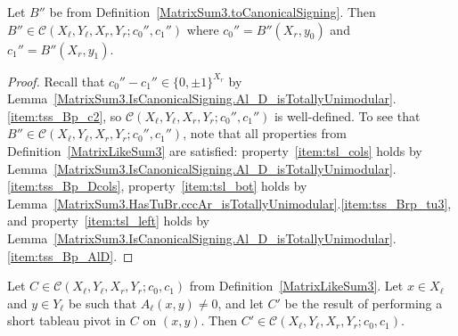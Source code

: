 \begin{lemma}
    \label{lem:three_sum_like_signing_B}
    \leanok
    Let $B''$ be from Definition~\ref{MatrixSum3.toCanonicalSigning}. Then $B'' \in \mathcal{C} (X_{\ell}, Y_{\ell}, X_{r}, Y_{r}; c_{0}'', c_{1}'')$ where $c_{0}'' = B'' (X_{r}, y_{0})$ and $c_{1}'' = B'' (X_{r}, y_{1})$.
\end{lemma}

\begin{proof}
    Recall that $c_{0}'' - c_{1}'' \in \{0, \pm 1\}^{X_{r}}$ by Lemma~\ref{MatrixSum3.IsCanonicalSigning.Al_D_isTotallyUnimodular}.\ref{item:tss_Bp_c2}, so $\mathcal{C} (X_{\ell}, Y_{\ell}, X_{r}, Y_{r}; c_{0}'', c_{1}'')$ is well-defined. To see that $B'' \in \mathcal{C} (X_{\ell}, Y_{\ell}, X_{r}, Y_{r}; c_{0}'', c_{1}'')$, note that all properties from Definition~\ref{MatrixLikeSum3} are satisfied: property~\ref{item:tsl_cols} holds by Lemma~\ref{MatrixSum3.IsCanonicalSigning.Al_D_isTotallyUnimodular}.\ref{item:tss_Bp_Dcols}, property~\ref{item:tsl_bot} holds by Lemma~\ref{MatrixSum3.HasTuBr.cccAr_isTotallyUnimodular}.\ref{item:tss_Brp_tu3}, and property~\ref{item:tsl_left} holds by Lemma~\ref{MatrixSum3.IsCanonicalSigning.Al_D_isTotallyUnimodular}.\ref{item:tss_Bp_AlD}.
\end{proof}

\begin{lemma}
    \label{MatrixLikeSum3.shortTableauPivot}
    \leanok
    Let $C \in \mathcal{C} (X_{\ell}, Y_{\ell}, X_{r}, Y_{r}; c_{0}, c_{1})$ from Definition~\ref{MatrixLikeSum3}. Let $x \in X_{\ell}$ and $y \in Y_{\ell}$ be such that $A_{\ell} (x, y) \neq 0$, and let $C'$ be the result of performing a short tableau pivot in $C$ on $(x, y)$. Then $C' \in \mathcal{C} (X_{\ell}, Y_{\ell}, X_{r}, Y_{r}; c_{0}, c_{1})$.
\end{lemma}

